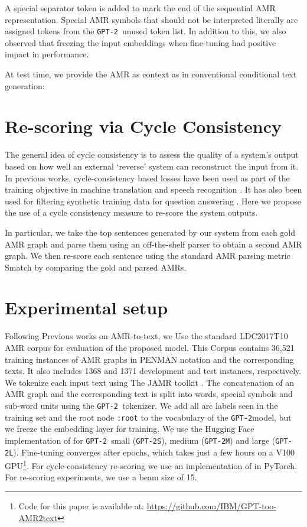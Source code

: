 \documentclass[11pt,a4paper]{article}
\newcommand{\GPTs}{\texttt{GPT-2S}}
\newcommand{\GPTm}{\texttt{GPT-2M}}
\newcommand{\GPTl}{\texttt{GPT-2L}}
\newcommand{\GPT}{\texttt{GPT-2}}
\begin{document}
A special separator token is added to mark the end of the sequential AMR representation. Special AMR symbols that should not be interpreted literally are assigned tokens from the \GPT~unused token list. In addition to this, we also observed that freezing the input embeddings when fine-tuning had positive impact in performance. 

At test time, we provide the AMR as context as in conventional conditional text generation:



\section{Re-scoring via Cycle Consistency}

The general idea of cycle consistency is to assess the quality of a system's output based on how well an external `reverse' system can reconstruct the input from it. In previous works, cycle-consistency based losses have been used as part of the training objective in machine translation \cite{he2016dual} and speech recognition \cite{hori2019cycle}. It has also been used for filtering synthetic training data for question answering \cite{alberti-etal-2019-synthetic}. Here we propose the use of a cycle consistency measure to re-score the system outputs. 

In particular, we take the top  sentences generated by our system from each gold AMR graph and parse them using an off-the-shelf parser to obtain a second AMR graph. We then re-score each sentence using the standard AMR parsing metric Smatch \cite{cai2013smatch} by comparing the gold and parsed AMRs.

\section{Experimental setup}
\label{sec:exp}

Following Previous works on AMR-to-text, we Use the standard LDC2017T10 AMR corpus for evaluation of the proposed model. This Corpus contains 36,521 training instances of AMR graphs in PENMAN notation and the corresponding texts. It also includes 1368 and 1371 development and test instances, respectively. We tokenize each input text using The JAMR toolkit \cite{flanigan2014discriminative}. The concatenation of an AMR graph and the corresponding text is split into words, special symbols and sub-word units using the \GPT~tokenizer. We add all arc labels seen in the training set and the root node \texttt{:root} to the vocabulary of the \GPT model, but we freeze the embedding layer for training. We use the Hugging Face implementation of \cite{wolf2019transformers} for \GPT~small (\GPTs), medium (\GPTm) and large (\GPTl). Fine-tuning converges after  epochs, which takes just a few hours on a V100 GPU\footnote{Code for this paper is available at: \url{https://github.com/IBM/GPT-too-AMR2text}}. For cycle-consistency re-scoring we use an implementation of  in PyTorch. For re-scoring experiments, we use a beam size of 15. 
\end{document}

